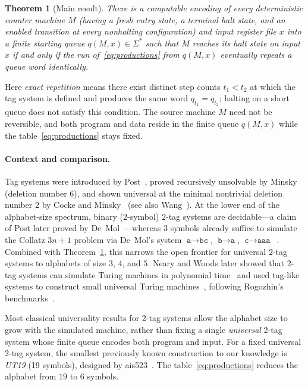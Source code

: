 \documentclass{article}
\newtheorem{theorem}{Theorem}
\theoremstyle{definition}
\theoremstyle{remark}
\newcommand{\ttw}[1]{\texttt{#1}}
\begin{document}
\begin{theorem}[Main result]\label{thm:main}
There is a computable encoding of every deterministic counter machine $M$ (having a fresh entry state, a terminal halt state, and an enabled transition at every nonhalting configuration) and input register file $x$ into a finite starting queue $q(M,x) \in \Sigma^*$ such that $M$ reaches its halt state on input $x$ if and only if the run of~\eqref{eq:productions} from $q(M,x)$ eventually repeats a queue word identically.
\end{theorem}

Here \emph{exact repetition} means there exist distinct step counts $t_1 < t_2$ at which the tag system is defined and produces the same word $q_{t_1} = q_{t_2}$; halting on a short queue does not satisfy this condition.
The source machine $M$ need not be reversible, and both program and data reside in the finite queue $q(M,x)$ while the table~\eqref{eq:productions} stays fixed.

\paragraph{Context and comparison.}
Tag systems were introduced by Post~\cite{Post1943}, proved recursively unsolvable by Minsky~\cite{Minsky1961} (deletion number $6$), and shown universal at the minimal nontrivial deletion number $2$ by Cocke and Minsky~\cite{CockeMinsky1964} (see also Wang~\cite{Wang1963}).
At the lower end of the alphabet-size spectrum, binary ($2$-symbol) $2$-tag systems are decidable---a claim of Post later proved by De~Mol~\cite{DeMol2010}---whereas $3$ symbols already suffice to simulate the Collatz $3n+1$ problem via De~Mol's system $\ttw{a} \to \ttw{bc}$, $\ttw{b} \to \ttw{a}$, $\ttw{c} \to \ttw{aaa}$~\cite{DeMol2008}.
Combined with Theorem~\ref{thm:main}, this narrows the open frontier for universal $2$-tag systems to alphabets of size $3$, $4$, and $5$.
Neary and Woods later showed that 2-tag systems can simulate Turing machines in polynomial time~\cite{NearyWoods2006} and used tag-like systems to construct small universal Turing machines~\cite{NearyWoods2009}, following Rogozhin's benchmarks~\cite{Rogozhin1996}.

Most classical universality results for 2-tag systems allow the alphabet size to grow with the simulated machine, rather than fixing a single \emph{universal} 2-tag system whose finite queue encodes both program and input.
For a fixed universal 2-tag system, the smallest previously known construction to our knowledge is \emph{UT19} (19 symbols), designed by ais523~\cite{ais523UT19}.
The table~\eqref{eq:productions} reduces the alphabet from $19$ to $6$ symbols.
\end{document}
